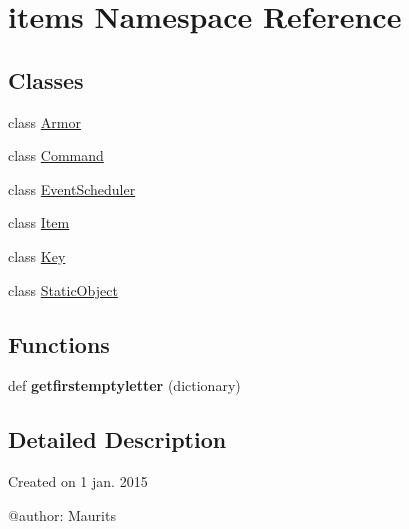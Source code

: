 \hypertarget{namespaceitems}{}\section{items Namespace Reference}
\label{namespaceitems}
\subsection*{Classes}
\begin{DoxyCompactItemize}
\item 
class \hyperlink{classitems_1_1_armor}{Armor}
\item 
class \hyperlink{classitems_1_1_command}{Command}
\item 
class \hyperlink{classitems_1_1_event_scheduler}{Event\+Scheduler}
\item 
class \hyperlink{classitems_1_1_item}{Item}
\item 
class \hyperlink{classitems_1_1_key}{Key}
\item 
class \hyperlink{classitems_1_1_static_object}{Static\+Object}
\end{DoxyCompactItemize}
\subsection*{Functions}
\begin{DoxyCompactItemize}
\item 
\hypertarget{namespaceitems_a9cb69fbc195e24c4764fb10be2162e8e}{}def {\bfseries getfirstemptyletter} (dictionary)\label{namespaceitems_a9cb69fbc195e24c4764fb10be2162e8e}

\end{DoxyCompactItemize}


\subsection{Detailed Description}
\begin{DoxyVerb}Created on 1 jan. 2015

@author: Maurits
\end{DoxyVerb}
 